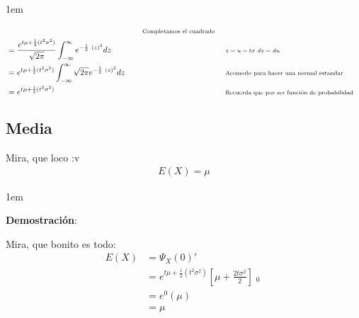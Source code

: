 \documentclass[12pt, fleqn]{report}                             %
\newenvironment{SmallIndentation}[1][0.75em]                    %
        {\begin{adjustwidth}{#1}{}\begin{footnotesize}}             %
        {\end{footnotesize}\end{adjustwidth}}                       %
\DeclareMathOperator \Space     {\quad}                         %
\newcommand \Remember[1]    {\Space\text{\scriptsize{#1}}}      %
\theoremstyle{break}                                            %
\newcommand{\Wrap}[1]           {\left( #1 \right)}             %
\newcommand{\Brackets}[1]       {\left[ #1 \right]}             %
\DeclareMathOperator \Evaluate  {\Big|}                         %
\begin{document}
\begin{SmallIndentation}[1em]
\begin{align*}
                                && \Remember{Completamos el cuadrado}                               \\
                            &= \dfrac{e^{t\mu + \frac{1}{2}(t^2\sigma^2)}}{\sqrt{2\pi}}
                                    \int_{-\infty}^\infty 
                                        e^{-\frac{1}{2} \
                                            \Wrap{z}^2
                                        } dz
                                && \Remember{$z = u - t\sigma$ $dz=du$}                             \\
                            &= e^{t\mu + \frac{1}{2}(t^2\sigma^2)}
                                \int_{-\infty}^\infty 
                                    {\sqrt{2\pi}}
                                        e^{-\frac{1}{2} \
                                            \Wrap{z}^2
                                        } dz
                                && \Remember{Acomodo para hacer una normal estandar}                \\
                            &= e^{t\mu + \frac{1}{2}(t^2\sigma^2)}
                                && \Remember{Recuerda que por ser función de probabilidad}
                    \end{align*}
                
                \end{SmallIndentation}


            \clearpage
            \subsection{Media}

                Mira, que loco :v
                \begin{align*}
                    E(X) = \mu
                \end{align*}

                \begin{SmallIndentation}[1em]
                    \textbf{Demostración}:
                    
                    Mira, que bonito es todo:
                    \begin{align*}
                        E(X)
                            &= \Psi_X(0)'                                           \\
                            &= e^{t\mu + \frac{1}{2}(t^2\sigma^2)} 
                                \Brackets{\mu + \frac{2t\sigma^2}{2}} \Evaluate_0   \\
                            &= e^0 (\mu)                                            \\
                            &= \mu
                    \end{align*}
                
                \end{SmallIndentation}
                    
\end{document}
